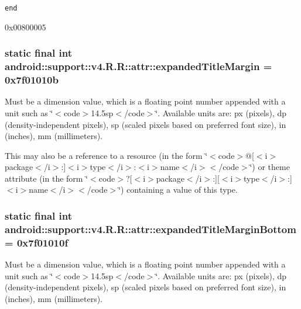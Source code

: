{\tt end}

0x00800005\hypertarget{classandroid_1_1support_1_1v4_1_1_r_1_1attr_bfee3e18afa8fd56753671e71bb47850}{
\subsubsection[{expandedTitleMargin}]{\setlength{\rightskip}{0pt plus 5cm}static final int android::support::v4.R.R::attr::expandedTitleMargin = 0x7f01010b}}
\label{classandroid_1_1support_1_1v4_1_1_r_1_1attr_bfee3e18afa8fd56753671e71bb47850}


Must be a dimension value, which is a floating point number appended with a unit such as \char`\"{}$<$code$>$14.5sp$<$/code$>$\char`\"{}. Available units are: px (pixels), dp (density-independent pixels), sp (scaled pixels based on preferred font size), in (inches), mm (millimeters). 

This may also be a reference to a resource (in the form \char`\"{}$<$code$>$@\mbox{[}$<$i$>$package$<$/i$>$:\mbox{]}$<$i$>$type$<$/i$>$:$<$i$>$name$<$/i$>$$<$/code$>$\char`\"{}) or theme attribute (in the form \char`\"{}$<$code$>$?\mbox{[}$<$i$>$package$<$/i$>$:\mbox{]}\mbox{[}$<$i$>$type$<$/i$>$:\mbox{]}$<$i$>$name$<$/i$>$$<$/code$>$\char`\"{}) containing a value of this type. \hypertarget{classandroid_1_1support_1_1v4_1_1_r_1_1attr_50f61f5d79e4689083dee57356df5145}{
\subsubsection[{expandedTitleMarginBottom}]{\setlength{\rightskip}{0pt plus 5cm}static final int android::support::v4.R.R::attr::expandedTitleMarginBottom = 0x7f01010f}}
\label{classandroid_1_1support_1_1v4_1_1_r_1_1attr_50f61f5d79e4689083dee57356df5145}


Must be a dimension value, which is a floating point number appended with a unit such as \char`\"{}$<$code$>$14.5sp$<$/code$>$\char`\"{}. Available units are: px (pixels), dp (density-independent pixels), sp (scaled pixels based on preferred font size), in (inches), mm (millimeters). 

